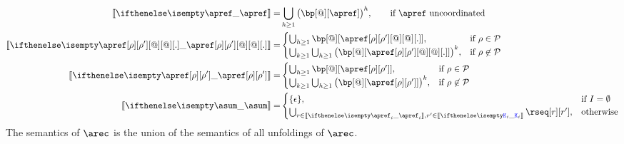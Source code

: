 \begin{align*}
  \ksem{\apref} =
  &
    \bigcup_{h \geq 1}\big(\bp[@][\apref]\big)^h,
  \qquad \text{if $\apref$ uncoordinated}
  \\
  \ksem{\apref[\arole][\arole'][@][@][.]} =
  &
    \begin{cases}
      \bigcup_{h \geq 1}\bp[@][{\apref[\arole][\arole'][@][@][.]}],
      & \text{if } \arole \in \participants %
      \\
      \bigcup_{k \geq 1}\bigcup_{h \geq 1}\big(\bp[@][{\apref[\arole][\arole'][@][@][.]}]\big)^k,
      & \text{if } \arole \not\in \participants %
    \end{cases}
  \\
  \ksem{\apref[\arole][\arole']} =
  &
    \begin{cases}
      \bigcup_{h \geq 1}\bp[@][{\apref[\arole][\arole']}],
      & \text{if } \arole \in \participants %
      \\
      \bigcup_{k \geq 1}\bigcup_{h \geq 1}\big(\bp[@][{\apref[\arole][\arole']}]\big)^k,
      & \text{if } \arole \not\in \participants %
    \end{cases}
  \\
  \ksem \asum =
  &
    \begin{cases}
      \{ \emptypom \}, & \text{if } I = \emptyset
      \\
      \bigcup_{\apom \in \ksem{\apref_i},\apom' \in \ksem{\aK_i}} \rseq[\apom][\apom'],
      & \text{otherwise}
    \end{cases}
\end{align*}
The semantics of $\arec$ is the union of the semantics of all
unfoldings of $\arec$.




